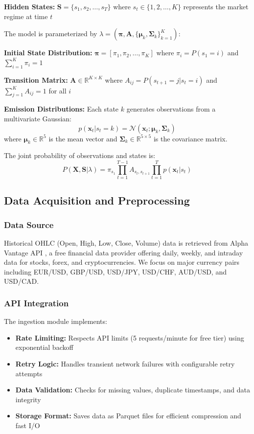 \documentclass[conference]{IEEEtran}
\begin{document}
\textbf{Hidden States:} $\mathbf{S} = \{s_1, s_2, \ldots, s_T\}$ where $s_t \in \{1, 2, \ldots, K\}$ represents the market regime at time $t$

The model is parameterized by $\lambda = (\boldsymbol{\pi}, \mathbf{A}, \{\boldsymbol{\mu}_k, \boldsymbol{\Sigma}_k\}_{k=1}^K)$:

\textbf{Initial State Distribution:} $\boldsymbol{\pi} = [\pi_1, \pi_2, \ldots, \pi_K]$ where $\pi_i = P(s_1 = i)$ and $\sum_{i=1}^{K}\pi_i = 1$

\textbf{Transition Matrix:} $\mathbf{A} \in \mathbb{R}^{K \times K}$ where $A_{ij} = P(s_{t+1}=j | s_t=i)$ and $\sum_{j=1}^{K}A_{ij} = 1$ for all $i$

\textbf{Emission Distributions:} Each state $k$ generates observations from a multivariate Gaussian:
\begin{equation}
p(\mathbf{x}_t | s_t=k) = \mathcal{N}(\mathbf{x}_t; \boldsymbol{\mu}_k, \boldsymbol{\Sigma}_k)
\end{equation}
where $\boldsymbol{\mu}_k \in \mathbb{R}^5$ is the mean vector and $\boldsymbol{\Sigma}_k \in \mathbb{R}^{5 \times 5}$ is the covariance matrix.

The joint probability of observations and states is:
\begin{equation}
P(\mathbf{X}, \mathbf{S} | \lambda) = \pi_{s_1} \prod_{t=1}^{T-1} A_{s_t, s_{t+1}} \prod_{t=1}^{T} p(\mathbf{x}_t | s_t)
\end{equation}

\subsection{Data Acquisition and Preprocessing}

\subsubsection{Data Source}
Historical OHLC (Open, High, Low, Close, Volume) data is retrieved from Alpha Vantage API \cite{alphavantage}, a free financial data provider offering daily, weekly, and intraday data for stocks, forex, and cryptocurrencies. We focus on major currency pairs including EUR/USD, GBP/USD, USD/JPY, USD/CHF, AUD/USD, and USD/CAD.

\subsubsection{API Integration}
The ingestion module implements:
\begin{itemize}
\item \textbf{Rate Limiting:} Respects API limits (5 requests/minute for free tier) using exponential backoff
\item \textbf{Retry Logic:} Handles transient network failures with configurable retry attempts
\item \textbf{Data Validation:} Checks for missing values, duplicate timestamps, and data integrity
\item \textbf{Storage Format:} Saves data as Parquet files for efficient compression and fast I/O
\end{itemize}
\end{document}

